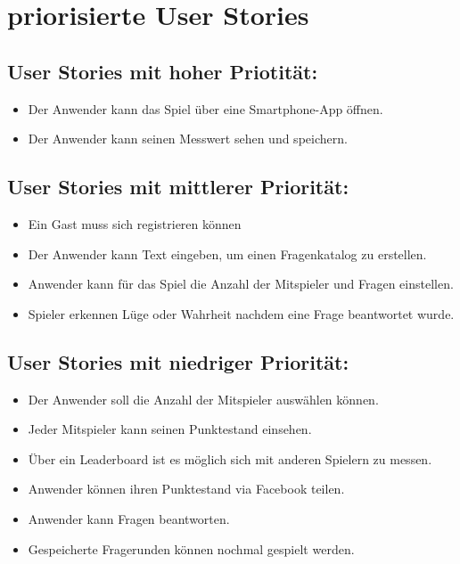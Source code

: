 	\newpage	
	\section{priorisierte User Stories}	
	\subsection{User Stories mit hoher Priotität:}
	\begin{itemize}
	\item{}Der Anwender kann das Spiel über eine Smartphone-App öffnen.
	\item{}Der Anwender kann seinen Messwert sehen und speichern.
	\end{itemize}
	\subsection{User Stories mit mittlerer Priorität:}
	\begin{itemize}
	\item{}Ein Gast muss sich registrieren können	
	\item{}Der Anwender kann Text eingeben, um einen Fragenkatalog zu erstellen.
	\item{}Anwender kann für das Spiel die Anzahl der Mitspieler und Fragen einstellen.
	\item{}Spieler erkennen Lüge oder Wahrheit nachdem eine Frage beantwortet wurde.
	\end{itemize}
	\subsection{User Stories mit niedriger Priorität:}
	\begin{itemize}
	\item{}Der Anwender soll die Anzahl der  Mitspieler auswählen können.
	\item{}Jeder Mitspieler kann seinen Punktestand einsehen.
	\item{}Über ein Leaderboard ist es möglich sich mit anderen Spielern zu messen.
	\item{}Anwender können ihren Punktestand via Facebook teilen.
	\item{}Anwender kann Fragen beantworten.
	\item{}Gespeicherte Fragerunden können nochmal gespielt werden.
	\end{itemize}
